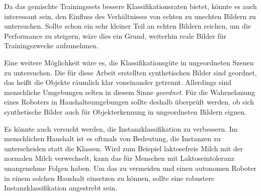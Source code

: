 Da das gemischte Trainingssets bessere Klassifikationsraten bietet, könnte es auch interessant sein, den Einfluss des Verhältnisses von echten zu unechten Bildern zu untersuchen. Sollte schon ein sehr kleiner Teil an echten Bildern reichen, um die Performance zu steigern, wäre dies ein Grund, weiterhin reale Bilder für Trainingszwecke aufzunehmen. \par 

Eine weitere Möglichkeit wäre es, die Klassifikationsgüte in ungeordneten Szenen zu untersuchen. Die für diese Arbeit erstellten synthetischen Bilder sind geordnet, das heißt die Objekte räumlich klar voneinander getrennt. Allerdings sind menschliche Umgebungen selten in diesem Sinne \textit{geordnet}. Für die Wahrnehmung eines Roboters in Haushaltsumgebungen sollte deshalb überprüft werden, ob sich synthetische Bilder auch für Objekterkennung in ungeordneten Bildern eignen. \par 

Es könnte auch versucht werden, die Instanzklassifikation zu verbessern.  Im menschlichen Haushalt ist es oftmals von Bedeutung, die Instanzen zu unterscheiden statt die Klassen. Wird zum Beispiel laktosefreie Milch mit der normalen Milch verwechselt, kann das für Menschen mit Laktoseintoleranz unangenehme Folgen haben. Um das zu vermeiden und einen autonomen Roboter in einem solchen Haushalt einsetzen zu können, sollte eine robustere Instanzklassifikation angestrebt sein. 